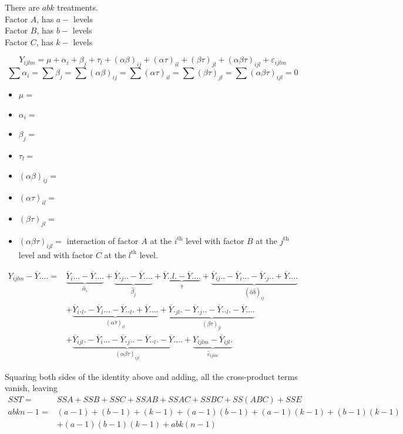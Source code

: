 \documentclass[11pt,a4paper]{article}
\theoremstyle{definition}
\begin{document}
There are $abk$ treatments.\\

Factor $A$, has $a-$ levels\\
Factor $B$, has $b-$ levels\\
Factor $C$, has $k-$ levels

$$Y_{ijlm}=\mu + \alpha_i + \beta_j + \tau_l + (\alpha \beta)_{ij} + (\alpha \tau)_{il} + (\beta \tau)_{jl}+(\alpha\beta\tau)_{ijl}+\varepsilon_{ijlm}$$
$$\sum \alpha_i=\sum \beta_j=\sum (\alpha\beta)_{ij}=\sum (\alpha\tau)_{il}=\sum (\beta\tau)_{jl}=\sum (\alpha\beta\tau)_{ijl}=0$$


\begin{itemize}
\item[] $\mu =$ 
\item[] $\alpha_i=$
\item[] $\beta_j=$
\item[] $\tau_l=$
\item[] $(\alpha\beta)_{ij}=$
\item[] $(\alpha \tau)_{il}=$
\item[] $(\beta\tau)_{jl}=$
\item[] $(\alpha\beta\tau)_{ijl}=$ interaction of factor $A$ at the $i^{\text{th}}$ level with factor $B$ at the $j^{\text{th}}$ level and with factor $C$ at the $l^{\text{th}}$ level.
\end{itemize}


\begin{align*}
Y_{ijlm}-\overline{Y}.... = & \underbrace{\overline{Y}_i...-\overline{Y}....}_{\hat{\alpha}_i} + \underbrace{\overline{Y}._j..-\overline{Y}....}_{\hat{\beta}_j} + \underbrace{\overline{Y}..l.-\overline{Y}....}_{\hat{\tau}} + \underbrace{\overline{Y}_{ij}..-\overline{Y}_i...-\overline{Y}._j..+\overline{Y}....}_{(\hat{\alpha}\hat{b})_{ij}}\\
& + \underbrace{\overline{Y}_i._l.-\overline{Y}_i...-\overline{Y}.._l.+\overline{Y}....}_{(\alpha \hat{\tau})_{il}}+\underbrace{\overline{Y}._{jl}.-\overline{Y}._j..-\overline{Y}.._l.-\overline{Y}....}_{(\beta\tau)_{jl}}\\
& + \underbrace{\overline{Y}_{ijl}.-\overline{Y}_i...-\overline{Y}._j..-\overline{Y}.._l.-\overline{Y}....}_{(\alpha\beta\tau)_{ijl}} + \underbrace{Y_{ijlm}-\overline{Y}_{ijl}.}_{\hat{\varepsilon}_{ijlm}}
\end{align*}


Squaring both sides of the identity above and adding, all the cross-product terms vanish, leaving 
\begin{align*}
SST  = & SSA + SSB + SSC + SSAB + SSAC + SSBC + SS(ABC) + SSE\\
abkn-1  = & (a-1) + (b-1) + (k-1) + (a-1)(b-1) + (a-1)(k-1) + (b-1)(k-1)\\
& + (a-1)(b-1)(k-1)+ abk(n-1)\\
\end{align*}
\end{document}
